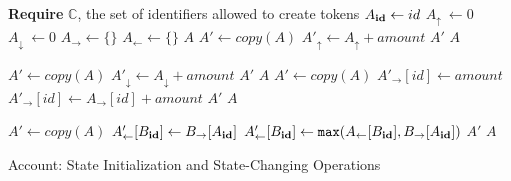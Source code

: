 \documentclass[9pt]{article}   	%
\begin{document}
\begin{algorithm}
\begin{algorithmic}[1]
   \State \textbf{Require} $\mathds{C}$, the set of identifiers allowed to create tokens
   \State
    	\State $A_{\scriptsize\textbf{id}} \leftarrow id$
	\State $A_\uparrow ~\leftarrow 0$       
	\State $A_\downarrow ~\leftarrow 0$   
	\State $A_\rightarrow \leftarrow \{ \}$ 
	\State $A_\leftarrow \leftarrow \{ \}$ 
    	\State \Return $A$
    \EndFunction
    \State
	      	 \State $A' \leftarrow \textit{copy}(A)$
		 \State $A'_\uparrow \leftarrow A_\uparrow + \textit{amount}$
		 \State \Return $A'$
	\Else
		\State \Return $A$
	\EndIf

    \EndFunction
    \State
    	 \label{ln:burn-balance-check}
		 \State $A' \leftarrow \textit{copy}(A)$
		 \State $A'_\downarrow \leftarrow A_\downarrow + \textit{amount}$
		 \State \Return $A'$
	\Else
		\State \Return $A$
	\EndIf
    \EndFunction
    \State
    	  \label{ln:give-balance-check}
	        \State $A' \leftarrow \textit{copy}(A)$
			\State $A'_{\rightarrow}[id] \leftarrow \textit{amount}$ 
		\Else
		         \State $A'_{\rightarrow}[id] \leftarrow A_{\rightarrow}[id] + \textit{amount}$ 
		\EndIf
		\State \Return $A'$
	\Else
		\State \Return $A$
	\EndIf

    \EndFunction
    \State
                \State $A' \leftarrow \textit{copy}(A)$
			 \State $A'_{\leftarrow}[B_{\scriptsize\textbf{id}}] \leftarrow B_{\rightarrow}[A_{\scriptsize\textbf{id}}]$
		\Else
			 \State $A'_{\leftarrow}[B_{\scriptsize\textbf{id}}] \leftarrow \texttt{max}(A_{\leftarrow}[B_{\scriptsize\textbf{id}}], B_{\rightarrow}[A_{\scriptsize\textbf{id}}])$ 
		\EndIf
		\State \Return $A'$
        \Else
        		\State \Return $A$
        \EndIf

    \EndFunction
    \end{algorithmic}
\caption{\label{alg:account} Account: State Initialization and State-Changing Operations}
\end{algorithm}
\end{document}

